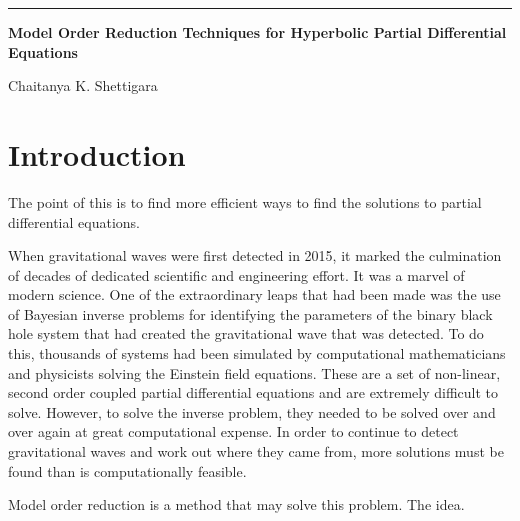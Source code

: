 


\begin{titlepage}
\begin{flushleft}
\hrule
\vspace{1 cm}
{\huge{\bf{Model Order Reduction Techniques for Hyperbolic Partial Differential Equations}}}


\vspace*{2cm}\vspace{3 cm}
{\large Chaitanya K. Shettigara}

\vspace{0.5 cm}{\today}
\end{flushleft}
\end{titlepage}

\newpage {}
\tableofcontents

\newpage {}

\chapter{Introduction}
The point of this is to find more efficient ways to find the solutions to partial differential equations. 

When gravitational waves were first detected in 2015, it marked the culmination of decades of dedicated scientific and engineering effort.  It was a marvel of modern science. One of the extraordinary leaps that had been made was the use of Bayesian inverse problems for identifying the parameters of the binary black hole system that had created the gravitational wave that was detected. To do this, thousands of systems had been simulated by computational mathematicians and physicists solving the Einstein field equations. These are a set of non-linear, second order coupled partial differential equations and are extremely difficult to solve. However, to solve the inverse problem, they needed to be solved over and over again at great computational expense. In order to continue to detect gravitational waves and work out where they came from, more solutions must be found than is computationally feasible.

Model order reduction is a method that may solve this problem. The idea.


